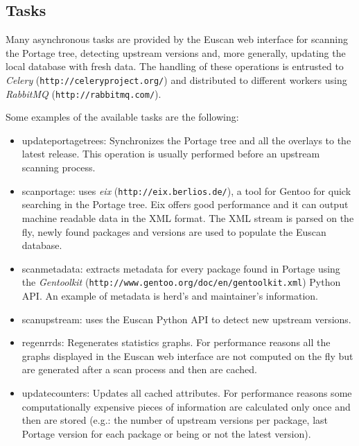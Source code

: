 \subsection{Tasks}
Many asynchronous tasks are provided by the Euscan web interface for scanning the Portage tree, detecting upstream versions and, more generally, updating the local database with fresh data.
The handling of these operations is entrusted to \emph{Celery} (\texttt{http://celeryproject.org/}) and distributed to different workers using \emph{RabbitMQ} (\texttt{http://rabbitmq.com/}).

Some examples of the available tasks are the following:
\begin{itemize}
\item update\textunderscore portage\textunderscore trees: Synchronizes the Portage tree and all the overlays to the latest release. This operation is usually performed before an upstream scanning process.

\item scan\textunderscore portage: uses \emph{eix} (\texttt{http://eix.berlios.de/}), a tool for Gentoo for quick searching in the Portage tree. Eix offers good performance and it can output machine readable data in the XML format. The XML stream is parsed on the fly, newly found packages and versions are used to populate the Euscan database.

\item scan\textunderscore metadata: extracts metadata for every package found in Portage using the \emph{Gentoolkit} (\texttt{http://www.gentoo.org/doc/en/gentoolkit.xml}) Python API. An example of metadata is herd's and maintainer's information.

\item scan\textunderscore upstream: uses the Euscan Python API to detect new upstream versions. 

\item regen\textunderscore rrds: Regenerates statistics graphs. For performance reasons all the graphs displayed in the Euscan web interface are not computed on the fly but are generated after a scan process and then are cached.

\item update\textunderscore counters: Updates all cached attributes. For performance reasons some computationally expensive pieces of information are calculated only once and then are stored (e.g.: the number of upstream versions per package, last Portage version for each package or being or not the latest version).
\end{itemize}


